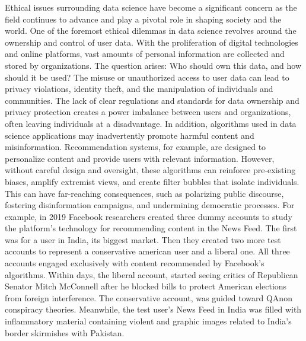 \documentclass{vgtc}                          %
\begin{document}
Ethical issues surrounding data science have become a significant concern as the field continues to advance and play a pivotal role in shaping society and the world. One of the foremost ethical dilemmas 
in data science revolves around the ownership and control of user data. With the proliferation of digital technologies and online platforms, vast amounts of personal information are collected and stored 
by organizations. The question arises: Who should own this data, and how should it be used? The misuse or unauthorized access to user data can lead to privacy violations, identity theft, and the manipulation 
of individuals and communities. The lack of clear regulations and standards for data ownership and privacy protection creates a power imbalance between users and organizations, often leaving individuals at a 
disadvantage. In addition, algorithms used in data science applications may inadvertently promote harmful content and misinformation. Recommendation systems, for example, are designed to personalize content 
and provide users with relevant information. However, without careful design and oversight, these algorithms can reinforce pre-existing biases, amplify extremist views, and create filter bubbles that isolate 
individuals. This can have far-reaching consequences, such as polarizing public discourse, fostering disinformation campaigns, and undermining democratic processes. For example, in 2019 Facebook researchers 
created three dummy accounts to study the platform's technology for recommending content in the News Feed. The first was for a user in India, its biggest market. Then they created two more test accounts to 
represent a conservative american user and a liberal one. All three accounts engaged exclusively with content recommended by Facebook's algorithms. Within days, the liberal account, started seeing critics of 
Republican Senator Mitch McConnell after he blocked bills to protect American elections from foreign interference. The conservative account, was guided toward QAnon conspiracy theories. Meanwhile, the test 
user's News Feed in India was filled with inflammatory material containing violent and graphic images related to India's border skirmishes with Pakistan.\cite{Bidar:2021}\newline
\end{document}
